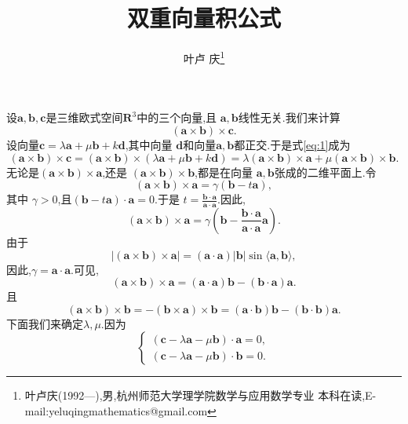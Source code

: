 \documentclass[a4paper]{article}
\begin{document}
\title{\huge{\bf{双重向量积公式}}} \author{\small{叶卢
    庆\footnote{叶卢庆(1992---),男,杭州师范大学理学院数学与应用数学专业
      本科在读,E-mail:yeluqingmathematics@gmail.com}}}
\maketitle
设$\mathbf{a,b,c}$是三维欧式空间$\mathbf{R}^3$中的三个向量,且
$\mathbf{a,b}$线性无关.我们来计算
\begin{equation}
  \label{eq:1}
  (\mathbf{a}\times \mathbf{b})\times \mathbf{c}.
\end{equation}
设向量$\mathbf{c}=\lambda \mathbf{a}+\mu \mathbf{b}+k\mathbf{d}$,其中向量
$\mathbf{d}$和向量$\mathbf{a},\mathbf{b}$都正交.于是式\eqref{eq:1}成为
\begin{equation}
  \label{eq:2}
(\mathbf{a}\times \mathbf{b})\times \mathbf{c}=(\mathbf{a}\times \mathbf{b})\times(\lambda
  \mathbf{a}+\mu \mathbf{b}+k\mathbf{d})=\lambda (\mathbf{a}\times
  \mathbf{b})\times \mathbf{a}+\mu (\mathbf{a}\times \mathbf{b})\times \mathbf{b}.
\end{equation}
无论是$(\mathbf{a}\times \mathbf{b})\times \mathbf{a}$,还是
$(\mathbf{a}\times \mathbf{b})\times \mathbf{b}$,都是在向量
$\mathbf{a},\mathbf{b}$张成的二维平面上.令
$$
(\mathbf{a}\times \mathbf{b})\times \mathbf{a}=\gamma
(\mathbf{b}-t\mathbf{a}),
$$
其中 $\gamma>0$,且$(\mathbf{b}-t\mathbf{a})\cdot \mathbf{a}=0$.于是
$t=\frac{\mathbf{b}\cdot \mathbf{a}}{\mathbf{a}\cdot \mathbf{a}}$.因此,
$$
(\mathbf{a}\times \mathbf{b})\times \mathbf{a}=\gamma(\mathbf{b}-
\frac{\mathbf{b}\cdot \mathbf{a}}{\mathbf{a}\cdot \mathbf{a}}\mathbf{a}).
$$
由于
$$
|(\mathbf{a}\times \mathbf{b})\times
\mathbf{a}|=(\mathbf{a}\cdot \mathbf{a})|\mathbf{b}|\sin\langle \mathbf{a},\mathbf{b}\rangle,
$$
因此,$\gamma=\mathbf{a}\cdot \mathbf{a}$.可见,
\begin{equation}\label{eq:3}
(\mathbf{a}\times \mathbf{b})\times \mathbf{a}=(\mathbf{a}\cdot
\mathbf{a})\mathbf{b}-(\mathbf{b}\cdot \mathbf{a})\mathbf{a}.
\end{equation}
且
\begin{equation}\label{eq:4}
(\mathbf{a}\times \mathbf{b})\times \mathbf{b}=-(\mathbf{b}\times
\mathbf{a})\times \mathbf{b}=(\mathbf{a}\cdot
\mathbf{b})\mathbf{b}-(\mathbf{b}\cdot \mathbf{b})\mathbf{a}.
\end{equation}
下面我们来确定$\lambda,\mu$.因为
$$
\begin{cases}
  (\mathbf{c}-\lambda \mathbf{a}-\mu \mathbf{b})\cdot \mathbf{a}=0,\\
  (\mathbf{c}-\lambda \mathbf{a}-\mu \mathbf{b})\cdot \mathbf{b}=0.
\end{cases}
$$
\end{document}
